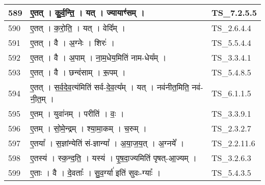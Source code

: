 \documentclass[17pt]{extarticle}
\begin{document}
\begin{longtable}{||p{0.4in}||p{4.9in}||p{0.9in}||}
    \hline
        
    589 & ए॒तत्   ।   कु॒र्व॒न्ति॒   ।   यत्   ।   ज्यायाꣳ॑सम्   ।    & TS\_7.2.5.5       \\
    
    \hline
        
    590 & ए॒तत्   ।   क॒रो॒ति॒   ।   यत्   ।   वेदि᳚म्   ।    & TS\_2.6.4.4       \\
    
    \hline
        
    591 & ए॒तत्   ।   वै   ।   अ॒ग्नेः   ।   शिरः॑   ।    & TS\_5.5.4.4       \\
    
    \hline
        
    592 & ए॒तत्   ।   वै   ।   अ॒पाम्   ।   ना॒म॒धेय॒मिति॑ नाम{-}धेय᳚म्   ।    & TS\_3.3.4.1       \\
    
    \hline
        
    593 & ए॒तत्   ।   वै   ।   छन्द॑साम्   ।   रू॒पम्   ।    & TS\_5.4.8.5       \\
    
    \hline
        
    594 & ए॒तत्   ।   स॒र्व॒दे॒व॒त्य॑मिति॑ सर्व{-}दे॒व॒त्य᳚म्   ।   यत्   ।   नव॑नीत॒मिति॒ नव॑{-}नी॒त॒म्   ।    & TS\_6.1.1.5       \\
    
    \hline
        
    595 & ए॒तम्   ।   युवा॑नम्   ।   परीति॑   ।   वः॒   ।    & TS\_3.3.9.1       \\
    
    \hline
        
    596 & ए॒तम्   ।   सो॒मे॒न्द्रम्   ।   श्या॒मा॒कम्   ।   च॒रुम्   ।    & TS\_2.3.2.7       \\
    
    \hline
        
    597 & ए॒तया᳚   ।   स॒ज्ञांन्येति॑ सं{-}ज्ञान्या᳚   ।   अ॒या॒ज॒य॒त्   ।   अ॒ग्नये᳚   ।    & TS\_2.2.11.6       \\
    
    \hline
        
    598 & ए॒तस्य॑   ।   स्क॒न्द॒ति॒   ।   यस्य॑   ।   पृ॒ष॒दा॒ज्यमिति॑ पृषत्{-}आ॒ज्यम्   ।    & TS\_3.2.6.3       \\
    
    \hline
        
    599 & ए॒ताः   ।   वै   ।   दे॒वताः᳚   ।   सु॒व॒र्ग्या॑ इति॑ सुवः{-}ग्याः᳚   ।    & TS\_5.4.3.5       \\
    

\end{longtable}
\end{document}
